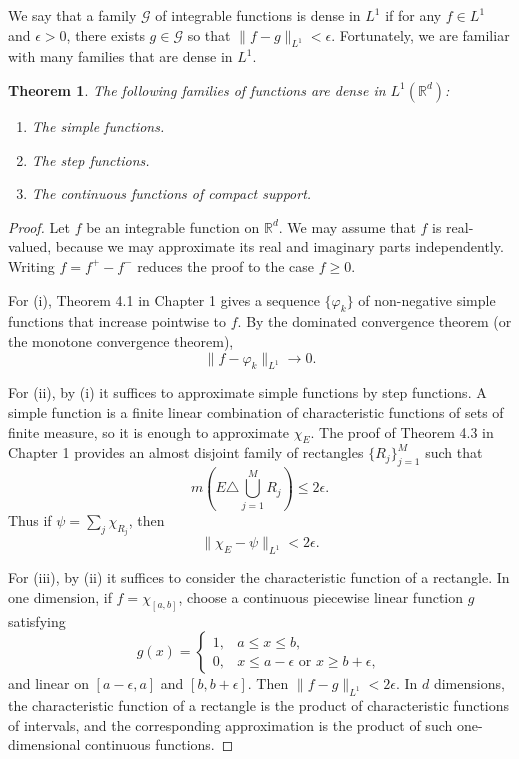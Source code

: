 \documentclass[11pt,openany]{book}
\newtheorem{theorem}{Theorem}[section]
\begin{document}
We say that a family $\mathcal{G}$ of integrable functions is dense in $L^1$ if for any $f\in L^1$ and $\epsilon>0$, there exists $g\in\mathcal{G}$ so that $\|f-g\|_{L^1}<\epsilon$. Fortunately, we are familiar with many families that are dense in $L^1$.

\begin{theorem}
The following families of functions are dense in $L^1(\mathbb{R}^d)$:
\begin{enumerate}
\item[(i)] The simple functions.
\item[(ii)] The step functions.
\item[(iii)] The continuous functions of compact support.
\end{enumerate}
\end{theorem}

\begin{proof}
Let $f$ be an integrable function on $\mathbb{R}^d$. We may assume that $f$ is real-valued, because we may approximate its real and imaginary parts independently. Writing $f=f^+-f^-$ reduces the proof to the case $f\geq0$.

For (i), Theorem 4.1 in Chapter 1 gives a sequence $\{\varphi_k\}$ of non-negative simple functions that increase pointwise to $f$. By the dominated convergence theorem (or the monotone convergence theorem),
\[
\|f-\varphi_k\|_{L^1}\to0.
\]

For (ii), by (i) it suffices to approximate simple functions by step functions. A simple function is a finite linear combination of characteristic functions of sets of finite measure, so it is enough to approximate $\chi_E$. The proof of Theorem 4.3 in Chapter 1 provides an almost disjoint family of rectangles $\{R_j\}_{j=1}^{M}$ such that
\[
m\left(E\triangle\bigcup_{j=1}^{M}R_j\right)\leq2\epsilon.
\]
Thus if $\psi=\sum_j\chi_{R_j}$, then
\[
\|\chi_E-\psi\|_{L^1}<2\epsilon.
\]

For (iii), by (ii) it suffices to consider the characteristic function of a rectangle. In one dimension, if $f=\chi_{[a,b]}$, choose a continuous piecewise linear function $g$ satisfying
\[
g(x)=
\begin{cases}
1,&a\leq x\leq b,\\
0,&x\leq a-\epsilon\text{ or }x\geq b+\epsilon,
\end{cases}
\]
and linear on $[a-\epsilon,a]$ and $[b,b+\epsilon]$. Then $\|f-g\|_{L^1}<2\epsilon$. In $d$ dimensions, the characteristic function of a rectangle is the product of characteristic functions of intervals, and the corresponding approximation is the product of such one-dimensional continuous functions.
\end{proof}
\end{document}
